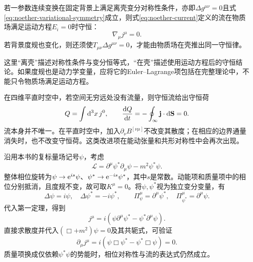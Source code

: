 \begin{theorem}[第一Noether定理]
    若一参数连续变换在固定背景上满足离壳变分对称性条件，亦即$\Delta g^{\mu\nu}=0$且式\eqref{eq:noether-variational-symmetry}成立，则式\eqref{eq:noether-current}定义的流在物质场满足运动方程$E_i=0$时守恒：
    \begin{equation}
        \nabla_\mu j^\mu=0.
    \end{equation}
    若背景度规也变化，则还须使$T_{\mu\nu}\Delta g^{\mu\nu}=0$，才能由物质场在壳推出同一守恒律。
\end{theorem}
这里“离壳”描述对称性条件与变分恒等式，“在壳”描述使用运动方程后的守恒结论。如果度规也是动力学变量，应将它的Euler--Lagrange项包括在完整理论中，不能只令物质场满足运动方程。

在四维平直时空中，若空间无穷远处没有流量，则守恒流给出守恒荷
\begin{equation}
    Q=\int\mathrm d^3x\,j^0,
    \qquad \frac{\mathrm d Q}{\mathrm d t}=-\oint_{\infty}\mathbf{j}\cdot\mathrm d\mathbf{S}=0.
\end{equation}
流本身并不唯一。在平直时空中，加入$\partial_\nu B^{[\nu\mu]}$不改变其散度；在相应的边界通量消失时，也不改变守恒荷。这类改进项在能动张量和共形对称性中会再次出现。

\begin{example}\label{csU1}
    沿用本书的复标量场记号$\psi$，考虑
    \begin{equation}
        \mathcal L=\partial^\mu\psi^*\partial_\mu\psi-m^2\psi^*\psi.
    \end{equation}
    整体相位旋转为$\psi\to\mathrm e^{is}\psi$、$\psi^*\to\mathrm e^{-is}\psi^*$，其中$s$是常数。动能项和质量项中的相位分别抵消，且度规不变，故可取$K^\mu=0$。将$\psi,\psi^*$视为独立变分变量，有
    \begin{equation}
        \Delta\psi=i\psi,\quad\Delta\psi^*=-i\psi^*,
        \qquad\Pi_\psi^\mu=\partial^\mu\psi^*,\quad
        \Pi_{\psi^*}^\mu=\partial^\mu\psi.
    \end{equation}
    代入第一定理，得到
    \begin{equation}
        \boxed{j^\mu=i(\psi\partial^\mu\psi^*-
        \psi^*\partial^\mu\psi).}
        \label{complex-scalar-u1-current}
    \end{equation}
    直接求散度并代入$(\Box+m^2)\psi=0$及其共轭式，可验证
    \begin{equation}
        \partial_\mu j^\mu
        =i(\psi\Box\psi^*-\psi^*\Box\psi)=0.
    \end{equation}
    质量项换成仅依赖$\psi^*\psi$的势能时，相位对称性与流的表达式仍然成立。
\end{example}

